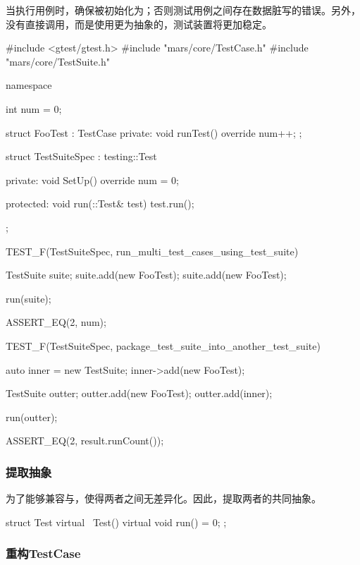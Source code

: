 \begin{content}
当执行用例时，确保被初始化为；否则测试用例之间存在数据脏写的错误。另外，没有直接调用，而是使用更为抽象的，测试装置将更加稳定。

\begin{leftbar}
 \begin{c++}[caption={\ttfamily{test/mars/core/TestSuiteSpec.cc}}]
#include <gtest/gtest.h>
#include "mars/core/TestCase.h"
#include "mars/core/TestSuite.h"

namespace {
  int num = 0;

  struct FooTest : TestCase {
  private:
    void runTest() override {
      num++;
    }
  };

  struct TestSuiteSpec : testing::Test {
  private:
    void SetUp() override {
      num = 0;
    }

  protected:
    void run(::Test& test) {
      test.run();
    }
  };
}

TEST_F(TestSuiteSpec, run_multi_test_cases_using_test_suite) {
  TestSuite suite;
  suite.add(new FooTest);
  suite.add(new FooTest);

  run(suite);

  ASSERT_EQ(2, num);
}

TEST_F(TestSuiteSpec, package_test_suite_into_another_test_suite) {
  auto inner = new TestSuite;
  inner->add(new FooTest);

  TestSuite outter;
  outter.add(new FooTest);
  outter.add(inner);

  run(outter);

  ASSERT_EQ(2, result.runCount());
}
 \end{c++}
\end{leftbar}

\subsubsection{提取抽象}

为了能够兼容与，使得两者之间无差异化。因此，提取两者的共同抽象。

\begin{leftbar}
 \begin{c++}[caption={\ttfamily{include/mars/core/Test.h}}]
struct Test {
  virtual ~Test() {}
  virtual void run() = 0;
};
 \end{c++}
\end{leftbar}

\subsubsection{重构TestCase}


\end{content}
